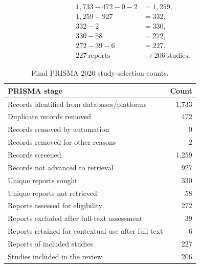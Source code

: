 \begin{align}
1{,}733 - 472 - 0 - 2 &= 1{,}259, \\
1{,}259 - 927 &= 332, \\
332 - 2 &= 330, \\
330 - 58 &= 272, \\
272 - 39 - 6 &= 227, \\
227\ \text{reports} &\longrightarrow 206\ \text{studies}.
\end{align}

\begin{table}[htbp]
\caption{Final PRISMA 2020 study-selection counts.}
\label{tab:prisma_final_counts}
\centering
\begin{tabular}{lr}
\toprule
\textbf{PRISMA stage} & \textbf{Count} \\
\midrule
Records identified from databases/platforms & 1,733 \\
Duplicate records removed & 472 \\
Records removed by automation & 0 \\
Records removed for other reasons & 2 \\
Records screened & 1,259 \\
Records not advanced to retrieval & 927 \\
Unique reports sought & 330 \\
Unique reports not retrieved & 58 \\
Reports assessed for eligibility & 272 \\
Reports excluded after full-text assessment & 39 \\
Reports retained for contextual use after full text & 6 \\
Reports of included studies & 227 \\
Studies included in the review & 206 \\
\bottomrule
\end{tabular}
\end{table}

